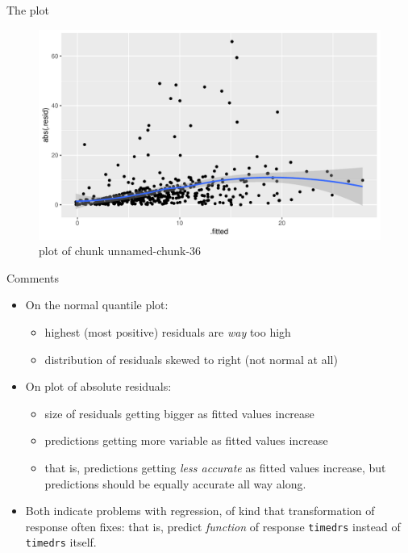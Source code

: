 \documentclass[ignorenonframetext,]{beamer}
\begin{document}
\begin{frame}{The plot}
\protect\hypertarget{the-plot}{}

\begin{figure}
\centering
\includegraphics{figure/unnamed-chunk-36-1.pdf}
\caption{plot of chunk unnamed-chunk-36}
\end{figure}

\end{frame}

\begin{frame}[fragile]{Comments}
\protect\hypertarget{comments-3}{}

\begin{itemize}
\item
  On the normal quantile plot:

  \begin{itemize}
  \item
    highest (most positive) residuals are \emph{way} too high
  \item
    distribution of residuals skewed to right (not normal at all)
  \end{itemize}
\item
  On plot of absolute residuals:

  \begin{itemize}
  \item
    size of residuals getting bigger as fitted values increase
  \item
    predictions getting more variable as fitted values increase
  \item
    that is, predictions getting \emph{less accurate} as fitted values
    increase, but predictions should be equally accurate all way along.
  \end{itemize}
\item
  Both indicate problems with regression, of kind that transformation of
  response often fixes: that is, predict \emph{function} of response
  \texttt{timedrs} instead of \texttt{timedrs} itself.
\end{itemize}

\end{frame}
\end{document}
